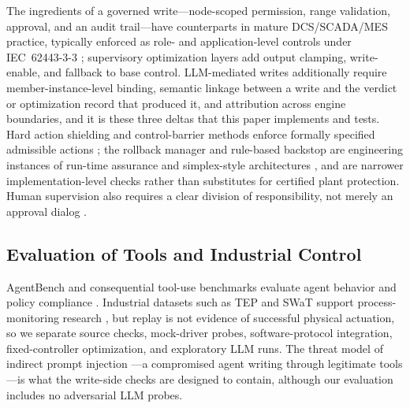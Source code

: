 The ingredients of a governed write---node-scoped permission, range validation,
approval, and an audit trail---have counterparts in mature DCS/SCADA/MES practice,
typically enforced as role- and application-level controls under IEC~62443-3-3
\cite{iec62443-3-3}; supervisory optimization layers add output clamping,
write-enable, and fallback to base control. LLM-mediated writes additionally require
member-instance-level binding, semantic linkage between a write and the verdict or
optimization record that produced it, and attribution across engine boundaries, and
it is these three deltas that this paper implements and tests. Hard action shielding
and control-barrier methods enforce formally specified admissible actions
\cite{alshiekh2018shielding}; the rollback manager and rule-based backstop are
engineering instances of run-time assurance and simplex-style architectures
\cite{sha2001simplex}, and are narrower implementation-level checks rather than
substitutes for certified plant protection. Human supervision also requires a clear
division of responsibility, not merely an approval dialog
\cite{parasuraman2000model,bainbridge1983ironies}.

\subsection{Evaluation of Tools and Industrial Control}
AgentBench and consequential tool-use benchmarks evaluate agent behavior and policy
compliance \cite{liu2024agentbench,yao2024taubench}. Industrial datasets such as TEP
and SWaT support process-monitoring research \cite{downs1993tep,goh2017swat}, but
replay is not evidence of successful physical actuation, so we separate source
checks, mock-driver probes, software-protocol integration, fixed-controller
optimization, and exploratory LLM runs. The threat model of
indirect prompt injection \cite{greshake2023injection}---a compromised agent writing
through legitimate tools---is what the write-side checks are designed to contain,
although our evaluation includes no adversarial LLM probes.

